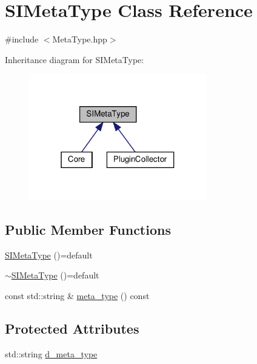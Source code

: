\hypertarget{class_s_i_meta_type}{}\section{S\+I\+Meta\+Type Class Reference}
\label{class_s_i_meta_type}


{\ttfamily \#include $<$Meta\+Type.\+hpp$>$}



Inheritance diagram for S\+I\+Meta\+Type\+:\nopagebreak
\begin{figure}[H]
\begin{center}
\leavevmode
\includegraphics[width=220pt]{class_s_i_meta_type__inherit__graph}
\end{center}
\end{figure}
\subsection*{Public Member Functions}
\begin{DoxyCompactItemize}
\item 
\mbox{\hyperlink{class_s_i_meta_type_a0cc60018de6ef6070c9a01b1e9ca23f2}{S\+I\+Meta\+Type}} ()=default
\item 
\mbox{\hyperlink{class_s_i_meta_type_ab6fdafe819117b3bebc7a302cd4c0cea}{$\sim$\+S\+I\+Meta\+Type}} ()=default
\item 
const std\+::string \& \mbox{\hyperlink{class_s_i_meta_type_a11a0163d4739f1e9c5ced44fb8a9dcbc}{meta\+\_\+type}} () const
\end{DoxyCompactItemize}
\subsection*{Protected Attributes}
\begin{DoxyCompactItemize}
\item 
std\+::string \mbox{\hyperlink{class_s_i_meta_type_a80557111c337358d1007832bcc403cd3}{d\+\_\+meta\+\_\+type}}
\end{DoxyCompactItemize}



